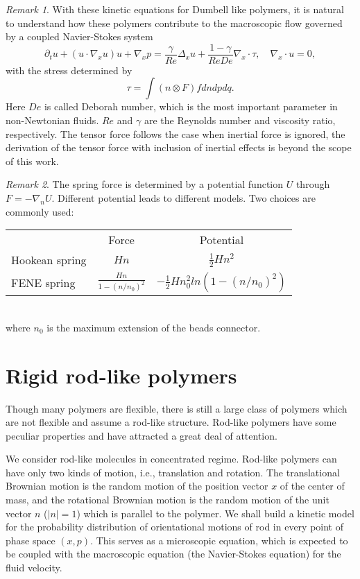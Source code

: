 \documentclass[reqno]{amsart}
\numberwithin{equation}{section}
\theoremstyle{definition}
\theoremstyle{remark}
\newtheorem{Remark}{Remark}[section]
\begin{document}
\begin{Remark} With these kinetic equations for Dumbell like polymers, it is
natural to understand how these polymers contribute to the
macroscopic flow governed by a coupled Navier-Stokes system
$$
\partial_t u +(u\cdot \nabla_x u)u+\nabla_x p= \frac{\gamma}{Re}\Delta_x u
+\frac{1-\gamma}{ReDe}\nabla_x \cdot \tau, \quad \nabla_x \cdot u=0,
$$
with the stress determined by
$$
\tau=\int (n\otimes F)fdndpdq.
$$
Here $De$ is called Deborah number, which is the most important
parameter in non-Newtonian fluids. $Re$ and $\gamma$ are the
Reynolds number and viscosity ratio, respectively.  The tensor force
follows the case when inertial force is ignored,  the derivation of
the tensor force with inclusion of inertial effects is beyond the
scope of this work.
\end{Remark}
\begin{Remark}
The spring force is determined by a potential function $U$ through $F=-\nabla_n U$. Different potential leads to different models. Two choices are commonly used: \\

\begin{tabular}{|l|c|c|}
  \hline
  
   & Force  & Potential \\
  Hookean spring & $Hn$& $\frac{1}{2}Hn^2$ \\
  FENE spring & $\frac{Hn}{1-(n/n_0)^2}$ & $-\frac{1}{2}Hn_0^2ln\left(1-(n/n_0)^2 \right)$ \\
  \hline
\end{tabular}\\

where $n_0$ is the maximum extension of the beads connector.
\end{Remark}

\section{Rigid rod-like polymers}
Though many polymers are flexible, there is still a large class of
polymers which are not flexible and assume a rod-like structure.
Rod-like polymers have some peculiar properties and have attracted
a great deal of attention.

We consider rod-like molecules in concentrated regime. Rod-like polymers can have only two kinds of motion, i.e., translation and rotation. The translational Brownian motion is the random motion of the position vector $x$ of the center of mass, and the rotational Brownian motion is the random motion of the unit vector $n$ ($|n|=1$) which is parallel to the polymer.  We shall build a kinetic model for the probability distribution of orientational motions of rod in every point of phase space $(x, p)$. This serves as a microscopic equation, which is expected to be coupled with the macroscopic equation (the Navier-Stokes equation) for the fluid velocity.
\end{document}
